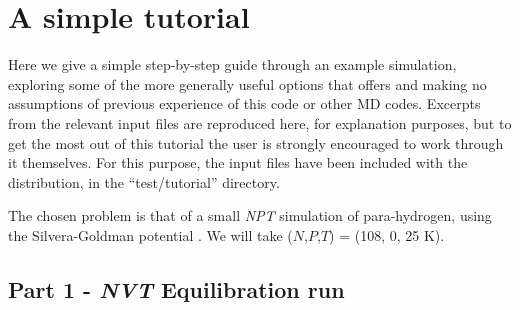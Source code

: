 \documentclass[11pt,english,fleqn]{report}
\begin{document}







%









































\chapter{A simple tutorial}

\label{tutorial}

Here we give a simple step-by-step guide through an example
simulation, exploring
some of the more generally useful options that \ipi offers and making
no assumptions of previous experience of this code or other MD codes.
Excerpts from the relevant input files are reproduced here, for explanation
purposes, but to get the most out of this tutorial the user is strongly encouraged
to work through it themselves. For this purpose, the input files
have been included with the \ipi distribution, in the {}``test/tutorial''
directory.

The chosen problem is that of a small \emph{NPT} simulation of para-hydrogen, 
using the Silvera-Goldman potential \cite{silv-gold78jcp}. 
We will take (\(N\),\(P\),\(T\)) = (108, 0, 25 K).

\section{Part 1 - \emph{NVT} Equilibration run}
\end{document}
